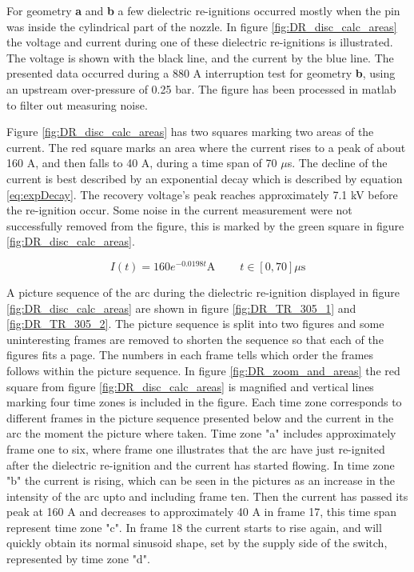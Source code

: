 \documentclass[10pt,b5paper,twoside]{article}
\begin{document}
For geometry \textbf{a} and \textbf{b} a few dielectric re-ignitions occurred mostly when the pin was inside the cylindrical part of the nozzle. In figure \ref{fig:DR_disc_calc_areas} the voltage and current during one of these dielectric re-ignitions is illustrated. The voltage is shown with the black line, and the current by the blue line. The presented data occurred during a 880 A interruption test for geometry \textbf{b}, using an upstream over-pressure of 0.25 bar. The figure has been processed in matlab to filter out measuring noise.

Figure \ref{fig:DR_disc_calc_areas} has two squares marking two areas of the current. The red square marks an area where the current rises to a peak of about 160 A, and then falls to 40 A, during a time span of 70 $\mu$s. The decline of the current is best described by an exponential decay which is described by equation \eqref{eq:expDecay}. The recovery voltage's peak reaches approximately 7.1 kV before the re-ignition occur. Some noise in the current measurement were not successfully removed from the figure, this is marked by the green square in figure \ref{fig:DR_disc_calc_areas}.

\begin{equation} \label{eq:expDecay}
I(t)=160e^{-0.0198t} \mathrm{A} \ \ \ \ \ \ \ \ \ \ t \in [0,70] \mu \mathrm{s}
\end{equation}

A picture sequence of the arc during the dielectric re-ignition displayed in figure \ref{fig:DR_disc_calc_areas} are shown in figure \ref{fig:DR_TR_305_1} and \ref{fig:DR_TR_305_2}. The picture sequence is split into two figures and some uninteresting frames are removed to shorten the sequence so that each of the figures fits a page. The numbers in each frame tells which order the frames follows within the picture sequence. In figure \ref{fig:DR_zoom_and_areas} the red square from figure \ref{fig:DR_disc_calc_areas} is magnified and vertical lines marking four time zones is included in the figure. Each time zone corresponds to different frames in the picture sequence presented below and the current in the arc the moment the picture where taken. Time zone "a" includes approximately frame one to six, where frame one illustrates that the arc have just re-ignited after the dielectric re-ignition and the current has started flowing. In time zone "b" the current is rising, which can be seen in the pictures as an increase in the intensity of the arc upto and including frame ten. Then the current has passed its peak at 160 A and decreases to approximately 40 A in frame 17, this time span represent time zone "c". In frame 18 the current starts to rise again, and will quickly obtain its normal sinusoid shape, set by the supply side of the switch, represented by time zone "d".
\end{document}
